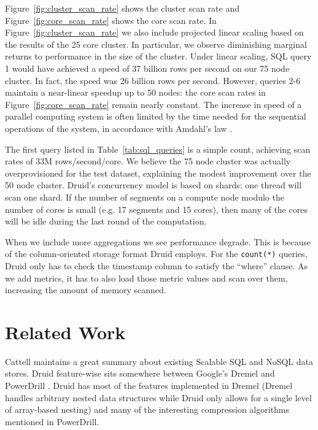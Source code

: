 \documentclass{vldb}
\begin{document}
Figure~\ref{fig:cluster_scan_rate} shows the cluster scan rate and
Figure~\ref{fig:core_scan_rate} shows the core scan rate.  In
Figure~\ref{fig:cluster_scan_rate} we also include projected linear
scaling based on the results of the 25 core cluster.  In particular,
we observe diminishing marginal returns to performance in the size of
the cluster.  Under linear scaling, SQL query 1 would have achieved a
speed of 37 billion rows per second on our 75 node cluster.  In fact,
the speed was 26 billion rows per second.  However, queries 2-6 maintain
a near-linear speedup up to 50 nodes: the core scan rates in
Figure~\ref{fig:core_scan_rate} remain nearly constant.
The increase in speed of a parallel
computing system is often limited by the time needed for the
sequential operations of the system, in accordance with Amdahl's law
\cite{amdahl1967validity}.

The first query listed in Table~\ref{tab:sql_queries} is a simple
count, achieving scan rates of 33M rows/second/core. We believe
the 75 node cluster was actually overprovisioned for the test
dataset, explaining the modest improvement over the 50 node cluster.
Druid's concurrency model is based on shards: one thread will scan one
shard. If the number of segments on a compute node modulo the number
of cores is small (e.g. 17 segments and 15 cores), then many of the
cores will be idle during the last round of the computation.

When we include more aggregations we see performance degrade.  This is
because of the column-oriented storage format Druid employs.  For the
\texttt{count(*)} queries, Druid only has to check the timestamp column to satisfy
the ``where'' clause.  As we add metrics, it has to also load those metric
values and scan over them, increasing the amount of memory scanned.

\section{Related Work}
\label{sec:related}
Cattell \cite{cattell2011scalable} maintains a great summary about existing Scalable SQL and
NoSQL data stores. Druid
feature-wise sits somewhere between Google’s Dremel \cite{melnik2010dremel} and PowerDrill
\cite{hall2012processing}. Druid has most of the features implemented in Dremel (Dremel
handles arbitrary nested data structures while Druid only allows for a
single level of array-based nesting) and many of the interesting
compression algorithms mentioned in PowerDrill.
\end{document}
